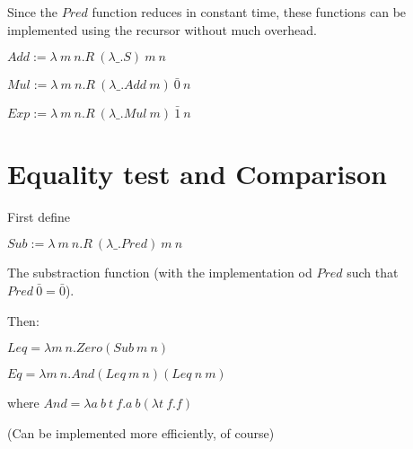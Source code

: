 Since the $Pred$ function reduces in constant time, these functions
can be implemented using the recursor without much overhead.

$Add := \lambda \: m \:n . R \: (\lambda \_ . S) \: m \: n$

$Mul := \lambda \: m \:n . R \: (\lambda \_ . Add \: m)\: \bar{0} \: n$

$Exp := \lambda \: m \:n . R \: (\lambda \_ . Mul \: m)\: \bar{1} \: n$

\section*{Equality test and Comparison}

First define

$Sub := \lambda \: m \:n . R \: (\lambda \_ . Pred) \: m \: n$

The substraction function (with the implementation od $Pred$ such that
$Pred \: \bar{0} = \bar{0}$).

Then:

$Leq = \lambda m \: n . Zero (Sub \: m \: n)$

$Eq = \lambda m \: n . And (Leq \: m \: n)(Leq \:  n \: m) $

where $And = \lambda a \: b \: t \: f . a \: b (\lambda t \: f . f)$

(Can be implemented more efficiently, of course)
